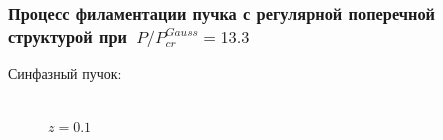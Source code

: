 \documentclass[fullscreen=true,unicode,bookmarks=true]{beamer}
\begin{document}
\begin{frame}
\begin{figure}[H]
\begin{center}
\begin{minipage}[h]{0.49\linewidth}
                \end{minipage}
            \end{center}
        \end{figure}
    \end{frame}

    \begin{frame}
        \frametitle{Процесс филаментации пучка с регулярной поперечной структурой при~$P/P_{cr}^{Gauss} = 13.3$}
        	
        	Синфазный пучок:
        	\vspace{-1em}
            \begin{figure}[H]
                \begin{center}
                    \begin{minipage}[h]{0.24\linewidth}
                         \\ \footnotesize{$z = 0.1$} \\
                    \end{minipage}
                    \hfill
                    \begin{minipage}[h]{0.24\linewidth}

\end{minipage}
\end{center}
\end{figure}
\end{frame}
\end{document}
